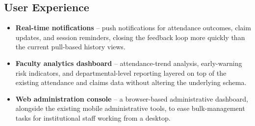 \documentclass[12pt, a4paper, oneside]{report}
\begin{document}
\subsection{User Experience}
\begin{itemize}
    \item \textbf{Real-time notifications} -- push notifications for attendance outcomes, claim updates, and session reminders, closing the feedback loop more quickly than the current pull-based history views.
    \item \textbf{Faculty analytics dashboard} -- attendance-trend analysis, early-warning risk indicators, and departmental-level reporting layered on top of the existing attendance and claims data without altering the underlying schema.
    \item \textbf{Web administration console} -- a browser-based administrative dashboard, alongside the existing mobile administrative tools, to ease bulk-management tasks for institutional staff working from a desktop.
\end{itemize}
\end{document}
